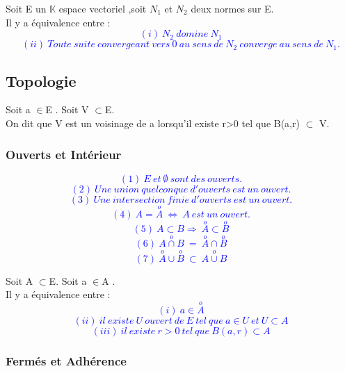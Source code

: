 \documentclass{article}
\begin{document}
\begin{theo}
Soit E un $\mathbb{K}$ espace vectoriel ,soit $ N_{1}$ et $N_{2}$ deux normes sur E.\\
Il y a équivalence entre :
\textcolor{blue}{
\[(i) \  N_{2} \  domine \  N_{1}\]
\[(ii) \ Toute\ suite\ convergeant\ vers\ 0\ au\ sens\ de\ N_{2}\ converge\ au\ sens\ de\ N_{1}. \]}
\end{theo}

\subsection{Topologie }


\begin{defi}

Soit a $\in$E . Soit V $\subset$E.\\
On dit que V est un voisinage de a lorsqu'il existe r>0 tel que B(a,r) $\subset$ V.


\end{defi}


\subsubsection{Ouverts et Intérieur}
\begin{theo}
\textcolor{blue}{
\[(1) \  E\ et\ \emptyset \ sont\ des\ ouverts. \]
\[(2) \ Une\ union\ quelconque\ d'ouverts\ est\ un\ ouvert. \]
\[(3) \  Une\ intersection\ finie\ d'ouverts\ est\ un\ ouvert. \]
\[ (4) \ A=\overset{o}{A}\ \Leftrightarrow \ A\ est\ un\ ouvert.\]
\[(5) \ A\subset B \Rightarrow \ \overset{o}{A}\subset\overset{o}{B} \]
\[(6) \ \overset{o}{A\cap B} \ = \ \overset{o}{A}\cap \overset{o}{B} \]
\[(7) \ \overset{o}{A}\cup \overset{o}{B} \ \subset \ \overset{o}{A\cup B} \]}

\end{theo}




\begin{theo}
 Soit A $\subset$E. Soit a $\in$A .\\
 Il y a équivalence entre :
 \textcolor{blue}{
\[ (i) \ a\in \overset{o}{A} \]
\[(ii) \ il\ existe\ U\ ouvert\ de\ E\ tel\ que\ a\in U\ et\ U\subset A\]
\[(iii) \ il\ existe\ r>0\ tel\ que\ B(a,r)\subset A\]}


\end{theo}

\subsubsection{Fermés et Adhérence}
\end{document}
